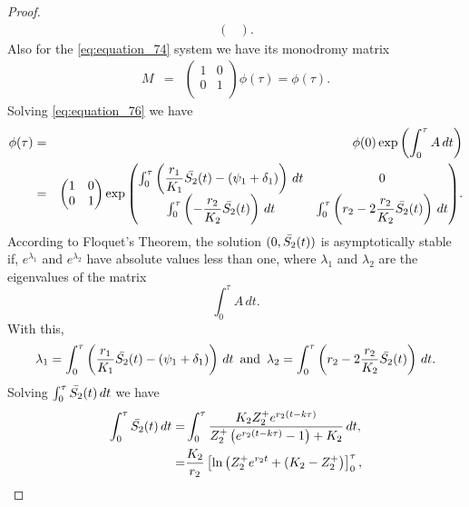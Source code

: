 \documentclass[10pt,letterpaper]{article}
\begin{document}
\begin{proof}
\begin{eqnarray}
\begin{pmatrix}
\end{pmatrix}.
\end{eqnarray}
Also for the \eqref{eq:equation_74} system we have its monodromy matrix 
\begin{eqnarray}\label{eq:equation_78}
M&=& \begin{pmatrix}
1 & 0  \\
0 & 1\\
\end{pmatrix}\phi(\tau) = \phi(\tau).
\end{eqnarray}
Solving \eqref{eq:equation_76} we have
\begin{eqnarray}\label{eq:equation_79}
    \phi(\tau) &=& \phi(0)\exp{\left(\int_0^{\tau}A\,dt\right)}\\
    &=& \begin{pmatrix}
1 & 0  \\
0 & 1\\
\end{pmatrix}\exp{\begin{pmatrix}
\int_0^{\tau}\left(\dfrac{r_1}{K_1}\Bar{S_2}(t)-(\psi_1+\delta_1)\right)\,dt & 0  \\\nonumber
\int_0^{\tau}\left(-\dfrac{r_2}{K_2}\Bar{S_2}(t)\right)\,dt & \int_0^{\tau}\left(r_2-2\dfrac{r_2}{K_2}\Bar{S_2}(t)\right)\,dt\\
\end{pmatrix}}.   
\end{eqnarray}
According to Floquet's Theorem, the solution $(0,\Bar{S_2}(t))$ is asymptotically stable if, $e^{\lambda_1}$ and $e^{\lambda_2}$ have absolute values less than one, where $\lambda_1$ and $\lambda_2$ are the eigenvalues of the matrix
\begin{equation}\label{eq:equation_80}
    \int_0^{\tau}A\,dt.
\end{equation}
With this,
\begin{eqnarray}\label{eq:equation_81}
    \lambda_1 = \int_0^{\tau}\left(\dfrac{r_1}{K_1}\Bar{S_2}(t)-(\psi_1+\delta_1)\right)\,dt \,\text{ and }\,\lambda_2 = \int_0^{\tau}\left(r_2-2\dfrac{r_2}{K_2}\Bar{S_2}(t)\right)\,dt.
\end{eqnarray}
Solving $\int_0^{\tau}\Bar{S_2}(t)\,dt$ we have
\begin{align}\label{eq:equation_82}\nonumber
    \int_0^{\tau}\Bar{S_2}(t)\,dt =& \int_0^{\tau}\dfrac{K_2 Z_2^{+} e^{r_2 (t-k\tau)}}{Z_2^{+}\left(e^{r_2 (t-k\tau)} -1\right)+K_2}\,dt,\\
    =&\dfrac{K_2}{r_2}\left[\ln{\left(Z_2^{+}e^{r_2 t}+(K_2-Z_2^{+}\right)}\right]_0^{\tau},\\

\end{align}
\end{proof}
\end{document}
